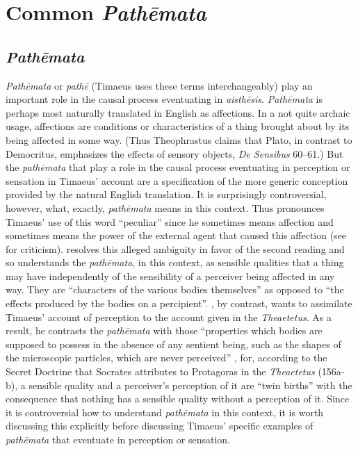 
\chapter{Common \emph{Pathēmata}} %
\label{cha:common_pathemata}

\section{\emph{Pathēmata}} %
\label{sec:pathemata}

\emph{Pathēmata} or \emph{pathē} (Timaeus uses these terms interchangeably) play an important role in the causal process eventuating in \emph{aisthēsis}. \emph{Pathēmata} is perhaps most naturally translated in English as affections. In a not quite archaic usage, affections are conditions or characteristics of a thing brought about by its being affected in some way. (Thus Theophrastus claims that Plato, in contrast to Democritus, emphasizes the effects of sensory objects, \emph{De Sensibus} 60--61.) But the \emph{pathēmata} that play a role in the causal process eventuating in perception or sensation in Timaeus' account are a specification of the more generic conception provided by the natural English translation. It is surprisingly controversial, however, what, exactly, \emph{pathēmata} means in this context. Thus \citet[225 n8]{Archer-Hind:1888qd} pronounces Timaeus' use of this word ``peculiar'' since he sometimes means affection and sometimes means the power of the external agent that caused this affection (see \citealt[113--5]{Cook-Wilson:1889cs} for criticism). \citet[429-31]{Taylor:1928qb} resolves this alleged ambiguity in favor of the second reading and so understands the \emph{pathēmata}, in this context, as sensible qualities that a thing may have independently of the sensibility of a perceiver being affected in any way. They are ``characters of the various bodies themselves'' as opposed to ``the effects produced by the bodies on a percipient''. \citet[258-9]{Cornford:1935fk}, by contrast, wants to assimilate Timaeus' account of perception to the account given in the \emph{Theaetetus}. As a result, he contrasts the \emph{pathēmata} with those ``properties which bodies are supposed to possess in the absence of any sentient being, such as the shapes of the microscopic particles, which are never perceived'' \citep[259]{Cornford:1935fk}, for, according to the Secret Doctrine that Socrates attributes to Protagoras in the \emph{Theaetetus} (156a-b), a sensible quality and a perceiver's perception of it are ``twin births'' with the consequence that nothing has a sensible quality without a perception of it. Since it is controversial how to understand \emph{pathēmata} in this context, it is worth discussing this explicitly before discussing Timaeus' specific examples of \emph{pathēmata} that eventuate in perception or sensation.

